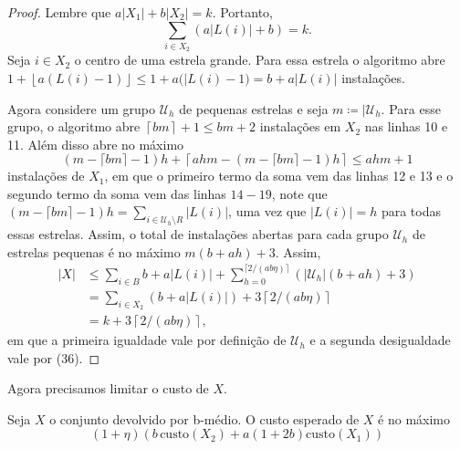 \begin{proof}
    Lembre que $a|X_1| + b|X_2| = k$. Portanto,
    \begin{equation}
        \sum_{i \in X_2}(a|L(i)| + b) = k.
    \end{equation}
    Seja $i \in X_2$ o centro de uma estrela grande. %
    Para essa estrela o algoritmo abre ${1 + \left \lfloor a(L(i) - 1) \right \rfloor \leq 1 + a(|L(i) - 1) = b + a|L(i)|}$ instalações.

    Agora considere um grupo $\mathcal{U}_h$ de pequenas estrelas e seja $m \coloneqq |\mathcal{U}_h$. Para esse grupo, o algoritmo abre $\left \lceil bm \right \rceil + 1 \leq bm + 2 $ instalações em $X_2$ nas linhas 10 e 11. Além disso abre no máximo 
    \begin{equation}
        (m - \lceil bm \rceil -1 ) h + \left \lceil ahm - (m - \lceil bm \rceil - 1)h \right \rceil \leq ahm + 1 \nonumber
    \end{equation}
    instalações de $X_1$, em que o primeiro termo da soma vem das linhas 12 e 13 e o segundo termo da soma vem das linhas $14 - 19$, note que $(m - \lceil bm \rceil - 1)h = \sum_{i \in \mathcal{U}_h \setminus R} |L(i)|$, uma vez que $|L(i)| = h$ para todas essas estrelas. Assim, o total de instalações abertas para cada grupo $\mathcal{U}_h$ de estrelas pequenas é no máximo $m (b + ah) + 3$. Assim,
    \begin{align}
        |X| &\leq \sum_{i \in B} b + a|L(i)| + \sum_{h = 0}^{\lceil 2/(ab\eta)\rceil} \left( |\mathcal{U}_h| (b + ah) + 3 \right) \nonumber \\
        & = \sum_{i \in X_2 } (b + a |L(i)|) + 3 \left \lceil 2/(ab\eta) \right \rceil \nonumber \\
        & = k + 3 \left \lceil 2/(ab\eta) \right \rceil \nonumber,
    \end{align}
    em que a primeira igualdade vale por definição de $\mathcal{U}_h$ e a segunda desigualdade vale por (36).
\end{proof}

Agora precisamos limitar o custo de $X$.

\begin{lemma}
    Seja $X$ o conjunto devolvido por {\sc b-médio}. O custo esperado de $X$ é no máximo 
    \[( 1 + \eta) (b\, \text{custo}(X_2) + a (1 + 2b)\text{custo}(X_1))\]
\end{lemma}

